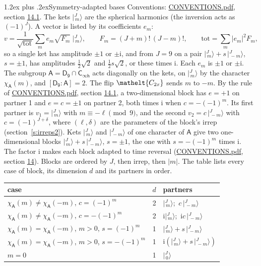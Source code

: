 \documentclass[10pt,a4paper]{article}
\makeatletter
\renewcommand\section{\@startsection{section}{1}{\z@}{-3ex plus -1ex minus -.2ex}%
  {1.2ex plus .2ex}{\normalfont\large\sffamily\bfseries\color{parttitle}}}
\numberwithin{equation}{section}
\newcommand{\eltfont}[1]{{\let\sigma\eltsigma\mathelt{#1}}}
\newcommand{\grp}[1]{\mathsf{#1}}
\newcommand{\elt}[1]{\eltfont{#1}}
\newcommand{\grpindex}[2]{[#1 : #2]}
\newcommand{\iunit}{\mathrm{i}}
\newcommand{\chiA}{\chi_{\grp{A}}}
\newcommand{\jm}[2]{\bigl\lvert{}^{#1}_{\,#2}\bigr\rangle}
\makeatother
\begin{document}
\section{Symmetry-adapted bases}\label{s:bases}
Conventions: \href{../../CONVENTIONS.pdf}{CONVENTIONS.pdf}, section \href{../../CONVENTIONS.pdf\#conv.14.1}{14.1}.
\leavevmode\label{n:index.m}\label{n:vector.ket}The kets $\jm{J}{m}$ are the spherical harmonics (the inversion acts as $(-1)^J$). \label{n:index.ketcoefficient}\label{n:vector.basis.symmetry}\label{n:index.ketweight}\label{n:index.total}A vector is listed by its coefficients $e_m$:
\begin{equation}\label{e:ket}v = \frac{1}{\sqrt{\mathrm{tot}}}\sum_m e_m\sqrt{F_m}\;\jm{J}{m},\qquad F_m = (J+m)!\,(J-m)!,\qquad \mathrm{tot} = \sum_m |e_m|^2F_m,\end{equation}
\leavevmode\label{n:index.pair.sign}so a single ket has amplitude $\pm1$ or $\pm\iunit$, and from $J = 9$ on a pair $\jm{J}{m} + s\,\jm{J}{-m}$, $s = \pm1$, has amplitudes $\tfrac{1}{2}\sqrt{2}$ and $\tfrac{1}{2}s\sqrt{2}$, or these times $\iunit$. Each $e_m$ is $\pm1$ or $\pm\iunit$.
\leavevmode\label{n:group.A}\label{n:function.character.abelian}The subgroup $\grp{A} = \grp{D_{9}}\cap\grp{C_{\infty h}}$ acts diagonally on the kets, on $\jm{J}{m}$ by the character $\chiA(m)$, and $\grpindex{\grp{D_{9}}}{\grp{A}} = 2$. The flip $\elt{C_{2x}}$ sends $m$ to $-m$. \label{n:index.partner.sign}By the rule of \href{../../CONVENTIONS.pdf}{CONVENTIONS.pdf}, section \href{../../CONVENTIONS.pdf\#conv.14.1}{14.1}, a two-dimensional block has $e = +1$ on partner 1 and $e = c = \pm1$ on partner 2, both times $\iunit$ when $c = -(-1)^m$. Its first partner is $v_1 = \jm{J}{m}$ with $m \equiv -\ell \pmod{9}$, and the second $v_2 = c\,\jm{J}{-m}$ with $c = (-1)^{J+\delta}$, where $(\ell, \delta)$ are the parameters of the block's irrep (section~\ref{s:irreps2}). Kets $\jm{J}{m}$ and $\jm{J}{-m}$ of one character of $\grp{A}$ give two one-dimensional blocks $\jm{J}{m} + s\,\jm{J}{-m}$, $s = \pm1$, the one with $s = -(-1)^m$ times $\iunit$. The factor $\iunit$ makes each block adapted to time reversal (\href{../../CONVENTIONS.pdf}{CONVENTIONS.pdf}, section \href{../../CONVENTIONS.pdf\#conv.14}{14}). Blocks are ordered by $J$, then irrep, then $|m|$.
\leavevmode\label{n:head.case}\label{n:head.partners}The table lists every case of block, its dimension $d$ and its partners in order.
\begin{center}\begin{tabular}{@{}lrl@{}}\toprule
case & $d$ & partners\\\midrule
$\chiA(m) \ne \chiA(-m)$, $c = (-1)^m$ & 2 & $\jm{J}{m}$;\ $c\,\jm{J}{-m}$\\
$\chiA(m) \ne \chiA(-m)$, $c = -(-1)^m$ & 2 & $\iunit\jm{J}{m}$;\ $\iunit c\,\jm{J}{-m}$\\
$\chiA(m) = \chiA(-m)$, $m > 0$, $s = (-1)^m$ & 1 & $\jm{J}{m} + s\,\jm{J}{-m}$\\
$\chiA(m) = \chiA(-m)$, $m > 0$, $s = -(-1)^m$ & 1 & $\iunit(\jm{J}{m} + s\,\jm{J}{-m})$\\
$m = 0$ & 1 & $\jm{J}{0}$\\
\bottomrule\end{tabular}\end{center}
\end{document}
